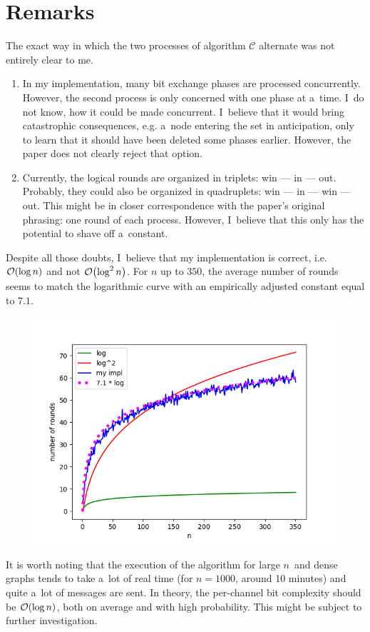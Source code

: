 \documentclass{article}
\DeclarePairedDelimiter{\parenthesesdelimiter}{(}{)}
\def\pars{\parenthesesdelimiter*}
\newcommand{\bigO}{\mathcal{O}}
\begin{document}
\section{Remarks}
The exact way in which the two processes of algorithm \(\mathcal{C}\) alternate was not entirely clear to me.
\begin{enumerate}
    \item In my implementation, many bit exchange phases are processed concurrently. However, the second process is only concerned with one phase at a~time. I~do not know, how it could be made concurrent. I~believe that it would bring catastrophic consequences, e.g. a~node entering the set in anticipation, only to learn that it should have been deleted some phases earlier. However, the paper does not clearly reject that option.
    \item Currently, the logical rounds are organized in triplets: win --- in --- out. Probably, they could also be organized in quadruplets: win --- in --- win --- out. This might be in closer correspondence with the paper's original phrasing: one round of each process. However, I~believe that this only has the potential to shave off a~constant.
\end{enumerate}
Despite all those doubts, I~believe that my implementation is correct, i.e. \(\bigO\pars{\log n}\) and not \(\bigO\pars{\log^2n}\). For \(n\) up to \(350\), the average number of rounds seems to match the logarithmic curve with an empirically adjusted constant equal to \(7.1\).
\begin{figure}[H]
    \centering
    \includegraphics{comparison.png}
\end{figure}
It is worth noting that the execution of the algorithm for large \(n\)~and dense graphs tends to take a~lot of real time (for \(n = 1000\), around 10 minutes) and quite a~lot of messages are sent. In theory, the per-channel bit complexity should be \(\bigO\pars{\log n}\), both on average and with high probability. This might be subject to further investigation.



\end{document}
